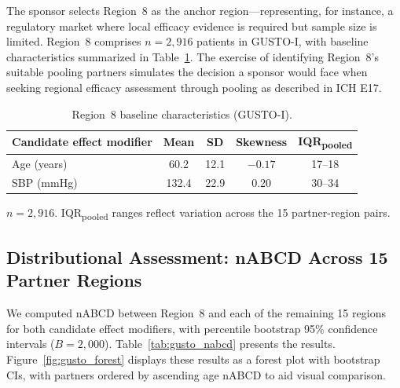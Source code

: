 The sponsor selects Region~8 as the anchor region---representing, for instance, a regulatory market where local efficacy evidence is required but sample size is limited. Region~8 comprises $n = 2{,}916$ patients in GUSTO-I, with baseline characteristics summarized in Table~\ref{tab:gusto_r8}. The exercise of identifying Region~8's suitable pooling partners simulates the decision a sponsor would face when seeking regional efficacy assessment through pooling as described in ICH E17.\cite{iche17}

\begin{table}[ht]
\caption{Region~8 baseline characteristics (GUSTO-I).\label{tab:gusto_r8}}
\begin{tabular*}{\textwidth}{@{\extracolsep\fill}lcccc@{}}
\toprule
\textbf{Candidate effect modifier} & \textbf{Mean} & \textbf{SD} & \textbf{Skewness} & \textbf{IQR\textsubscript{pooled}} \\
\midrule
Age (years) & 60.2 & 12.1 & $-0.17$ & 17--18 \\
SBP (mmHg) & 132.4 & 22.9 & 0.20 & 30--34 \\
\bottomrule
\end{tabular*}
\begin{tablenotes}
\item $n = 2{,}916$. IQR\textsubscript{pooled} ranges reflect variation across the 15 partner-region pairs.
\end{tablenotes}
\end{table}

\subsection{Distributional Assessment: nABCD Across 15 Partner Regions}\label{sec:app_nabcd}

We computed nABCD between Region~8 and each of the remaining 15 regions for both candidate effect modifiers, with percentile bootstrap 95\% confidence intervals ($B = 2{,}000$). Table~\ref{tab:gusto_nabcd} presents the results. Figure~\ref{fig:gusto_forest} displays these results as a forest plot with bootstrap CIs, with partners ordered by ascending age nABCD to aid visual comparison.

